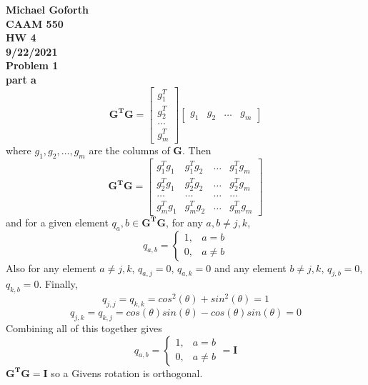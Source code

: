 \documentclass{article} %
\begin{document}
\textbf{Michael Goforth} \\
\textbf{CAAM 550} \\
\textbf{HW 4} \\
\textbf{9/22/2021} \\ 

\textbf{Problem 1} \\
\textbf{part a}
\begin{equation*}
\boldsymbol{G^T G} = \begin{bmatrix} g_1^T \\ g_2^T \\ \ldots \\ g_m^T \end{bmatrix} \begin{bmatrix} g_1 & g_2 & \ldots & g_m \end{bmatrix}
\end{equation*}
where $g_1, g_2, \ldots, g_m$ are the columns of $\boldsymbol{G}$.  Then
\begin{equation*}
\boldsymbol{G^T G} = \begin{bmatrix} g_1^T g_1 & g_1^T g_2 & \ldots & g_1^T g_m \\ g_2^T g_1 & g_2^T g_2 & \ldots & g_2^T g_m\\ \ldots & \ldots & \ldots & \ldots \\ g_m^T g_1 & g_m^T g_2 & \ldots & g_m^T g_m \end{bmatrix}
\end{equation*}
and for a given element $q_a,b \in \boldsymbol{G^T G}$, for any $a, b \neq j, k$, 
\begin{equation*}
q_{a, b} = \left\{\begin{array}{cl}1,& a = b \\
			0,& a \neq b \end{array}\right.
\end{equation*}
Also for any element $a \neq j, k$, $q_{a,j} = 0$, $q_{a, k} = 0$ and any element $b \neq j, k$, $q_{j, b} = 0$, $q_{k,b} = 0$.  Finally, 
\begin{equation*}
q_{j, j} = q_{k,k} = cos^2(\theta)+sin^2(\theta) = 1
\end{equation*}
\begin{equation*}
q_{j, k} = q_{k, j} = cos(\theta)sin(\theta) - cos(\theta)sin(\theta) = 0
\end{equation*}
Combining all of this together gives
\begin{equation*}
q_{a, b} = \left\{\begin{array}{cl}1,& a = b \\
			0,& a \neq b \end{array}\right. = \boldsymbol{I}
\end{equation*}
$\boldsymbol{G^TG} = \boldsymbol{I}$ so a Givens rotation is orthogonal.
\\
\end{document}
